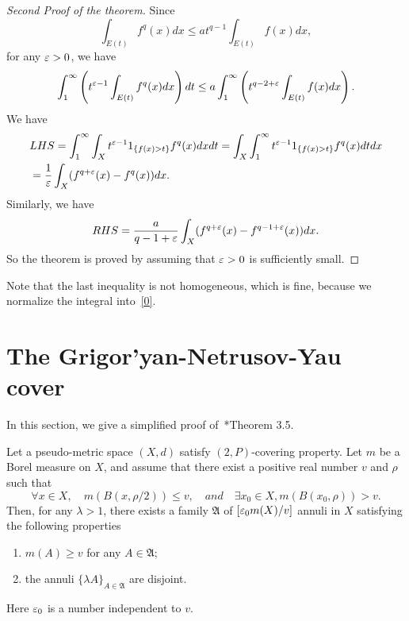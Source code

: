 \begin{proof}[Second Proof of the theorem] Since
\[
\int_{E(t)}f^q(x)dx\leq at^{q-1}\int_{E(t)} f(x) dx,
\]
for any $\varepsilon>0$, we have
\[
\int_1^\infty\left(t^{\varepsilon-1}\int_{E(t)}f^q(x)dx\right) dt\leq a \int_1^\infty\left(t^{q-2+\varepsilon}\int_{E(t)} f(x) dx
\right).
\]
We have
\[
\begin{split}
&
LHS=\int_1^\infty\int_X t^{\varepsilon-1}1_{\{f(x)>t\}}f^q(x) dxdt
=\int_X\int_1^\infty t^{\varepsilon-1}1_{\{f(x)>t\}}f^q(x) dtdx\\
&=\frac{1}{\varepsilon}\int_X (f^{q+\varepsilon}(x)-f^q(x))dx.
\end{split}
\]
Similarly, we have
\[
RHS=\frac{a}{q-1+\varepsilon}\int_X(f^{q+\varepsilon}(x)-f^{q-1+\varepsilon}(x))dx.
\]
So the theorem is proved by assuming that $\varepsilon>0$ is sufficiently small.
\end{proof}

\begin{remark} Note that the last inequality is not homogeneous, which is fine, because we normalize the integral into~\eqref{0}.
\end{remark}




 
 \section{The Grigor'yan-Netrusov-Yau cover}\label{GNY_cover}
In this section, we give a simplified proof of~\cite{GNY}*{Theorem 3.5}. 

\begin{theorem}
Let a pseudo-metric space $(X,d)$ satisfy $(2,P)$-covering property. Let $m$ be a Borel measure on $X$, and assume that there exist a positive real number $v$ and $\rho$ such that 
\begin{equation}\label{1}
\forall x\in X,\quad m(B(x,\rho/2))\leq v,\quad and\quad \exists x_0\in X, m(B(x_0,\rho))>v.
\end{equation}
Then, for any $\lambda>1$, there exists a family $\mathfrak A$ of $[\varepsilon_0m(X)/v]$ annuli 
in $X$ satisfying the following properties
\begin{enumerate}
\item $m(A)\geq v$ for any $A\in\mathfrak A$;
\item the annuli $\{\lambda A\}_{A\in\mathfrak A}$ are disjoint. 
\end{enumerate}
Here $\varepsilon_0$ is a number independent to $v$.
\end{theorem}






